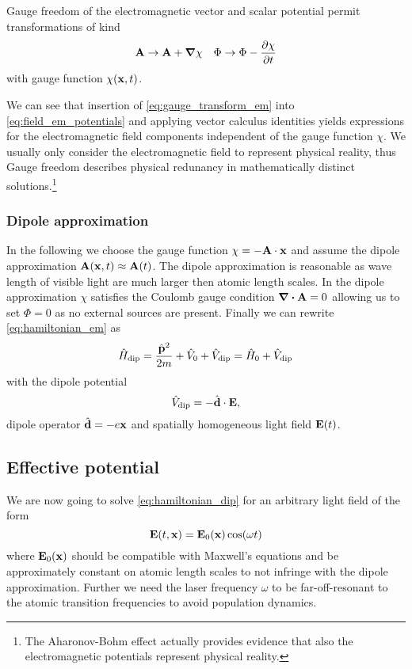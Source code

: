 Gauge freedom of the electromagnetic vector and scalar potential permit
transformations of kind
\begin{align}
  \vb{A}\to\vb{A}+\grad{\chi}
  &&
  \Phi\to\Phi-\pdv{\chi}{t}
  \label{eq:gauge_transform_em}
\end{align}
with gauge function $\chi(\vb{x},t)$.

We can see that insertion of \cref{eq:gauge_transform_em} into
\cref{eq:field_em_potentials} and applying vector calculus identities yields
expressions for the electromagnetic field components independent of the gauge
function $\chi$. We usually only consider the electromagnetic field to
represent physical reality, thus Gauge freedom describes physical redunancy
in mathematically distinct solutions.\footnote{The Aharonov-Bohm effect
actually provides evidence that also the electromagnetic potentials represent
physical reality.}

\subsubsection{Dipole approximation}

In the following we choose the gauge function $\chi=-\vb{A}\cdot\vb{x}$ and
assume the dipole approximation $\vb{A}(\vb{x},t)\approx\vb{A}(t)$. The
dipole approximation is reasonable as wave length of visible light are much
larger then atomic length scales\cite{Gerry2004}. In the dipole
approximation $\chi$ satisfies the Coulomb gauge condition
$\divergence{\vb{A}}=0$ allowing us to set $\Phi=0$ as no external sources
are present\cite{Jackson2005}. Finally we can rewrite
\cref{eq:hamiltonian_em} as
\begin{equation}
  \hat{H}_\text{dip}
  =\frac{\hat{\vb{p}}^2}{2m}+\hat{V}_0+\hat{V}_\text{dip}
  =\hat{H}_0+\hat{V}_\text{dip}
  \label{eq:hamiltonian_dip}
\end{equation}
with the dipole potential
\begin{equation}
  \hat{V}_\text{dip}
  =-\hat{\vb{d}}\cdot\vb{E}
  \label{eq:potential_dip},
\end{equation}
dipole operator $\hat{\vb{d}}=-e\vb{x}$ and spatially homogeneous light
field $\vb{E}(t)$.

\subsection{Effective potential}

We are now going to solve \cref{eq:hamiltonian_dip} for an arbitrary light
field of the form
\begin{equation}
  \vb{E}(t,\vb{x})
  =\vb{E}_0(\vb{x})\cos(\omega t)
  \label{eq:light_field}
\end{equation}
where $\vb{E}_0(\vb{x})$ should be compatible with Maxwell's equations and
be approximately constant on atomic length scales to not infringe with the
dipole approximation. Further we need the laser frequency $\omega$ to be
far-off-resonant to the atomic transition frequencies to avoid population
dynamics.

